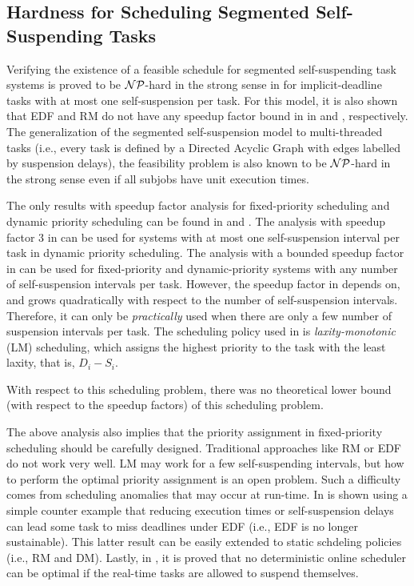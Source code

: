 \subsection{Hardness for Scheduling Segmented Self-Suspending Tasks}
Verifying the existence of a feasible schedule for segmented self-suspending task systems is proved to be ${\cal NP}$-hard in the strong sense in \cite{Ridouard_2004} for implicit-deadline tasks with at most one self-suspension per task. For this model, it is also shown that EDF and RM do not have any speedup factor bound in in \cite{Ridouard_2004} and \cite{RTSS-ChenL14}, respectively. The generalization of the segmented self-suspension model to multi-threaded tasks (i.e., every task is defined by a Directed Acyclic Graph with edges labelled by suspension delays), the feasibility problem is also known to be  ${\cal NP}$-hard in the strong sense  \cite{Ric03} even if all subjobs have unit execution times. 

The only results with speedup factor analysis for fixed-priority scheduling and dynamic priority scheduling can be found in \cite{RTSS-ChenL14} and \cite{WC16-suspend-DATE}. The analysis with speedup factor $3$ in \cite{RTSS-ChenL14} can be used for systems with at most one self-suspension interval per task in dynamic priority scheduling. The analysis with a bounded speedup factor in \cite{WC16-suspend-DATE} can be used for fixed-priority and dynamic-priority systems with any number of self-suspension intervals per task. However, the speedup factor in \cite{WC16-suspend-DATE} depends on, and grows quadratically with respect to the number of self-suspension intervals. Therefore, it can only be \emph{practically} used when there are only a few number of suspension intervals per task. The scheduling policy used in \cite{WC16-suspend-DATE} is \emph{laxity-monotonic} (LM) scheduling, which assigns the highest priority to the task with the least laxity, that is, $D_i-S_i$.

With respect to this scheduling problem, there was no theoretical lower bound (with respect to the speedup factors) of this scheduling problem. 


The above analysis also implies that the priority assignment in fixed-priority scheduling should be carefully designed. Traditional approaches like RM or EDF do not work very well. LM may work for a few self-suspending intervals, but how to perform the optimal priority assignment is an open problem. Such a difficulty comes from scheduling anomalies that may occur at run-time. In \cite{Ridouard_2004} is shown using a simple counter example that reducing execution times or self-suspension delays can lead some task to miss deadlines under EDF (i.e., EDF is no longer sustainable). This latter result can be easily extended to static schdeling policies (i.e., RM and DM). Lastly, in \cite{RidouardR06}, it is proved that no deterministic online scheduler can be optimal if the real-time tasks are allowed to suspend themselves.


